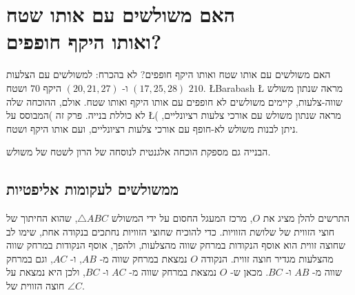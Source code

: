 
\chapter[\R{האם משולשים עם אותו שטח ואותו היקף חופפים?}]{האם משולשים עם אותו שטח\\
ואותו היקף חופפים?}

האם משולשים עם אותו שטח ואותו היקף חופפים? לא בהכרח: למשולשים עם הצלעות
$(17,25,28)$
ו-%
$(20,21,27)$
היקף
$70$
ושטח 
$210$.
\L{Barabash}
\L{\cite{marita}}
מראה שנתון משולש שווה-צלעות, קיימים משולשים לא חופפים עם אותו היקף ואותו שטח. אולם, ההוכחה שלה לא כוללת בנייה. פרק זה )המבוסס על 
\L{\cite{heron}}(
מראה שנתון משולש עם אורכי צלעות רציונליים, ניתן לבנות משולש לא-חופף עם אורכי צלעות רציונליים, ועם אותו היקף ושטח.

הבנייה גם מספקת הוכחה אלגנטית לנוסחה של הרון לשטח של משולש.


\section{%
ממשולשים לעקומות אליפטיות%
}

התרשים להלן מציג את 
$O$, 
מרכז המעגל החסום על ידי המשולש
$\triangle ABC$, 
שהוא החיתוך של חוצי הזווית של שלושת הזוויות. כדי להוכיח שחוצי הזוויות נחתכים בנקודה אחת, שימו לב שחוצה זווית הוא אוסף הנקודות במרחק שווה מהצלעות, ולהפך, אוסף הנקודות במרחק שווה מהצלעות מגדיר חוצה זווית. הנקודה
$O$
נמצאת במרחק שווה מ-%
$AB$,
ו-%
$AC$,
וגם במרחק שווה מ-%
$AB$
ו-%
$BC$.
מכאן ש-%
$O$
נמצאת במרחק שווה מ-%
$AC$
ו-%
$BC$,
ולכן היא נמצאת על חוצה הזווית של 
$\angle C$.

\vspace{-6ex}

